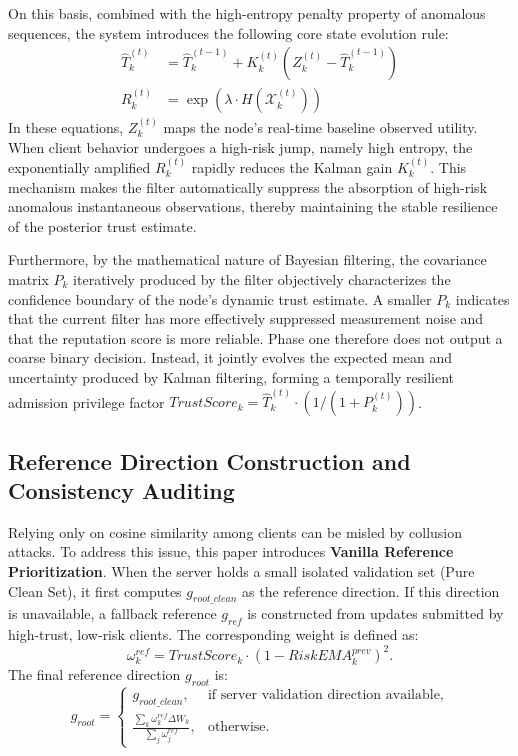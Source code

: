 \documentclass[final,5p,times,twocolumn]{elsarticle/elsarticle}
\begin{document}
On this basis, combined with the high-entropy penalty property of anomalous sequences, the system introduces the following core state evolution rule:
\begin{align}
    \hat{T}_k^{(t)} & = \hat{T}_k^{(t-1)} + K_k^{(t)} (Z_k^{(t)} - \hat{T}_k^{(t-1)}) \\
    R_k^{(t)}       & = \exp(\lambda \cdot H(\mathcal{X}_k^{(t)}))
\end{align}
In these equations, $Z_k^{(t)}$ maps the node's real-time baseline observed utility. When client behavior undergoes a high-risk jump, namely high entropy, the exponentially amplified $R_k^{(t)}$ rapidly reduces the Kalman gain $K_k^{(t)}$. This mechanism makes the filter automatically suppress the absorption of high-risk anomalous instantaneous observations, thereby maintaining the stable resilience of the posterior trust estimate.

Furthermore, by the mathematical nature of Bayesian filtering, the covariance matrix $P_k$ iteratively produced by the filter objectively characterizes the confidence boundary of the node's dynamic trust estimate. A smaller $P_k$ indicates that the current filter has more effectively suppressed measurement noise and that the reputation score is more reliable. Phase one therefore does not output a coarse binary decision. Instead, it jointly evolves the expected mean and uncertainty produced by Kalman filtering, forming a temporally resilient admission privilege factor $TrustScore_k = \hat{T}_k^{(t)} \cdot (1 / (1 + P_k^{(t)}))$.

\subsection{Reference Direction Construction and Consistency Auditing}
Relying only on cosine similarity among clients can be misled by collusion attacks. To address this issue, this paper introduces \textbf{Vanilla Reference Prioritization}. When the server holds a small isolated validation set (Pure Clean Set), it first computes $g_{root\_clean}$ as the reference direction. If this direction is unavailable, a fallback reference $g_{ref}$ is constructed from updates submitted by high-trust, low-risk clients. The corresponding weight is defined as:
\begin{equation}
    \omega_{k}^{ref} = TrustScore_{k} \cdot (1 - RiskEMA_{k}^{prev})^{2}.
\end{equation}
The final reference direction $g_{root}$ is:
\begin{equation}
    g_{root}=
    \begin{cases}
        g_{root\_clean},                                                   & \text{if server validation direction available}, \\
        \frac{\sum_k \omega_{k}^{ref}\Delta W_k}{\sum_j \omega_{j}^{ref}}, & \text{otherwise}.
    \end{cases}
\end{equation}
\end{document}
